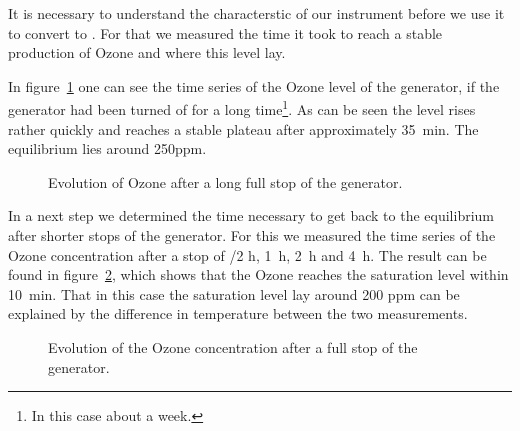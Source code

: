 It is necessary to understand the characterstic of our instrument
before we use it to convert  to . For that we measured
the time it took to reach a stable production of Ozone and where this
level lay. 

In figure~\ref{fig:long-stop} one can see the time series of the Ozone
level of the generator, if the generator had been turned of for a long
time\footnote{In this case about a week.}. As can be seen the level
rises rather quickly and reaches a stable plateau after approximately
\SI{35}{\minute}. The equilibrium lies around 250ppm.

\begin{figure}[htbp]
  \centering
  \caption{Evolution of Ozone after a long full stop of the
    generator.}
  \label{fig:long-stop}
\end{figure}

In a next step we determined the time necessary to get back to the
equilibrium after shorter stops of the generator. For this we measured
the time series of the Ozone concentration after a stop of {/2} \si{\hour}, \SI{1}{\hour}, \SI{2}{\hour} and \SI{4}{\hour}. The
result can be found in figure~\ref{fig:multiple-stop}, which shows
that the Ozone reaches the saturation level within
\SI{10}{\minute}. That in this case the saturation level lay around
200 ppm can be explained by the difference in temperature between the
two measurements. 

\begin{figure}[htbp]
  \centering
  \caption{Evolution of the Ozone concentration after a full stop of the
    generator.}
  \label{fig:multiple-stop}
\end{figure}

